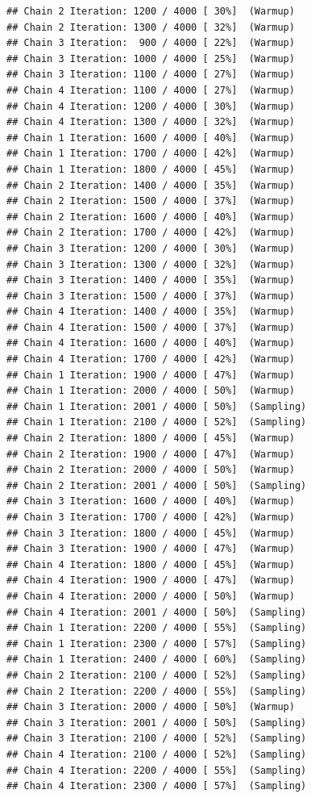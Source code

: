 \documentclass[
]{article}
\begin{document}
\begin{verbatim}
## Chain 2 Iteration: 1200 / 4000 [ 30%]  (Warmup) 
## Chain 2 Iteration: 1300 / 4000 [ 32%]  (Warmup) 
## Chain 3 Iteration:  900 / 4000 [ 22%]  (Warmup) 
## Chain 3 Iteration: 1000 / 4000 [ 25%]  (Warmup) 
## Chain 3 Iteration: 1100 / 4000 [ 27%]  (Warmup) 
## Chain 4 Iteration: 1100 / 4000 [ 27%]  (Warmup) 
## Chain 4 Iteration: 1200 / 4000 [ 30%]  (Warmup) 
## Chain 4 Iteration: 1300 / 4000 [ 32%]  (Warmup) 
## Chain 1 Iteration: 1600 / 4000 [ 40%]  (Warmup) 
## Chain 1 Iteration: 1700 / 4000 [ 42%]  (Warmup) 
## Chain 1 Iteration: 1800 / 4000 [ 45%]  (Warmup) 
## Chain 2 Iteration: 1400 / 4000 [ 35%]  (Warmup) 
## Chain 2 Iteration: 1500 / 4000 [ 37%]  (Warmup) 
## Chain 2 Iteration: 1600 / 4000 [ 40%]  (Warmup) 
## Chain 2 Iteration: 1700 / 4000 [ 42%]  (Warmup) 
## Chain 3 Iteration: 1200 / 4000 [ 30%]  (Warmup) 
## Chain 3 Iteration: 1300 / 4000 [ 32%]  (Warmup) 
## Chain 3 Iteration: 1400 / 4000 [ 35%]  (Warmup) 
## Chain 3 Iteration: 1500 / 4000 [ 37%]  (Warmup) 
## Chain 4 Iteration: 1400 / 4000 [ 35%]  (Warmup) 
## Chain 4 Iteration: 1500 / 4000 [ 37%]  (Warmup) 
## Chain 4 Iteration: 1600 / 4000 [ 40%]  (Warmup) 
## Chain 4 Iteration: 1700 / 4000 [ 42%]  (Warmup) 
## Chain 1 Iteration: 1900 / 4000 [ 47%]  (Warmup) 
## Chain 1 Iteration: 2000 / 4000 [ 50%]  (Warmup) 
## Chain 1 Iteration: 2001 / 4000 [ 50%]  (Sampling) 
## Chain 1 Iteration: 2100 / 4000 [ 52%]  (Sampling) 
## Chain 2 Iteration: 1800 / 4000 [ 45%]  (Warmup) 
## Chain 2 Iteration: 1900 / 4000 [ 47%]  (Warmup) 
## Chain 2 Iteration: 2000 / 4000 [ 50%]  (Warmup) 
## Chain 2 Iteration: 2001 / 4000 [ 50%]  (Sampling) 
## Chain 3 Iteration: 1600 / 4000 [ 40%]  (Warmup) 
## Chain 3 Iteration: 1700 / 4000 [ 42%]  (Warmup) 
## Chain 3 Iteration: 1800 / 4000 [ 45%]  (Warmup) 
## Chain 3 Iteration: 1900 / 4000 [ 47%]  (Warmup) 
## Chain 4 Iteration: 1800 / 4000 [ 45%]  (Warmup) 
## Chain 4 Iteration: 1900 / 4000 [ 47%]  (Warmup) 
## Chain 4 Iteration: 2000 / 4000 [ 50%]  (Warmup) 
## Chain 4 Iteration: 2001 / 4000 [ 50%]  (Sampling) 
## Chain 1 Iteration: 2200 / 4000 [ 55%]  (Sampling) 
## Chain 1 Iteration: 2300 / 4000 [ 57%]  (Sampling) 
## Chain 1 Iteration: 2400 / 4000 [ 60%]  (Sampling) 
## Chain 2 Iteration: 2100 / 4000 [ 52%]  (Sampling) 
## Chain 2 Iteration: 2200 / 4000 [ 55%]  (Sampling) 
## Chain 3 Iteration: 2000 / 4000 [ 50%]  (Warmup) 
## Chain 3 Iteration: 2001 / 4000 [ 50%]  (Sampling) 
## Chain 3 Iteration: 2100 / 4000 [ 52%]  (Sampling) 
## Chain 4 Iteration: 2100 / 4000 [ 52%]  (Sampling) 
## Chain 4 Iteration: 2200 / 4000 [ 55%]  (Sampling) 
## Chain 4 Iteration: 2300 / 4000 [ 57%]  (Sampling) 

\end{verbatim}
\end{document}
